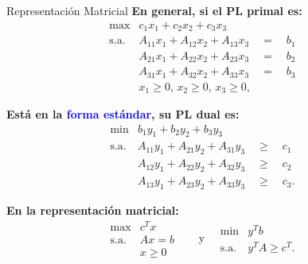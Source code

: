 \documentclass{beamer}
\begin{document}
\begin{frame}{Representación Matricial}
    \textbf{En general, si el PL primal es:}
    \[
    \begin{array}{lll}
    \text{max} & c_1x_1 + c_2x_2 + c_3x_3 & \\
    \text{s.a.} & A_{11}x_1 + A_{12}x_2 + A_{13}x_3 \quad = \quad b_1 & \\
    & A_{21}x_1 + A_{22}x_2 + A_{23}x_3 \quad = \quad b_2 & \\
    & A_{31}x_1 + A_{32}x_2 + A_{33}x_3 \quad = \quad b_3 & \\
    & x_1 \geq 0, \, x_2 \geq 0, \, x_3 \geq 0, &
    \end{array}
    \]

    \vspace{0.3cm}
    \textbf{Está en la \textcolor{blue}{forma estándar}, su PL dual es:}
    \[
    \begin{array}{lll}
    \text{min} & b_1y_1 + b_2y_2 + b_3y_3 & \\
    \text{s.a.} & A_{11}y_1 + A_{21}y_2 + A_{31}y_3 \quad \geq \quad c_1 & \\
    & A_{12}y_1 + A_{22}y_2 + A_{32}y_3 \quad \geq \quad c_2 & \\
    & A_{13}y_1 + A_{23}y_2 + A_{33}y_3 \quad \geq \quad c_3. &
    \end{array}
    \]

    \vspace{0.3cm}
    \textbf{En la representación matricial:}
    \[
    \begin{array}{lll}
    \text{max} & c^T x & \\
    \text{s.a.} & Ax = b & \\
    & x \geq 0 &
    \end{array}
    \quad \text{y} \quad
    \begin{array}{lll}
    \text{min} & y^T b & \\
    \text{s.a.} & y^T A \geq c^T. &
    \end{array}
    \]
\end{frame}
\end{document}
